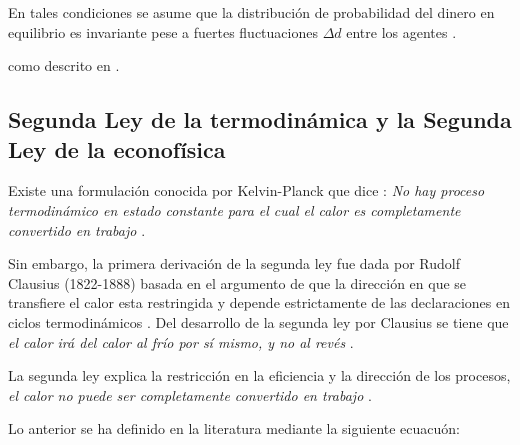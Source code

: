 En tales condiciones se asume que la distribución de probabilidad del dinero en equilibrio es invariante pese a fuertes fluctuaciones $\Delta d$ entre los agentes \citep[][pagina 149]{cottrell_classical_2009}.



como descrito en \citep{Huang2021}.



\subsection{Segunda Ley de la termodinámica y la Segunda Ley de la econofísica} 


%



Existe una formulación conocida por Kelvin-Planck que dice : \textit{No hay proceso termodinámico en estado constante para el cual el calor es completamente convertido en trabajo} \citep[][pagina 86]{struchtrup}.

Sin embargo, la primera derivación de la segunda ley fue dada por Rudolf Clausius (1822-1888) basada en el argumento de que la dirección en que se transfiere el calor esta restringida y depende estrictamente de las declaraciones en ciclos termodinámicos \citep[][pagina 55]{struchtrup}.  Del desarrollo de la segunda ley por Clausius se tiene que \textit{el calor irá del calor al frío por sí mismo, y no al revés} \citep[][pagina 64]{struchtrup}.

La segunda ley explica la restricción en la eficiencia y la dirección de los procesos, \textit{el calor no puede ser completamente convertido en trabajo} \citep[][pagina 5]{struchtrup}. 

Lo anterior se ha definido en la literatura mediante la siguiente ecuacuón:

